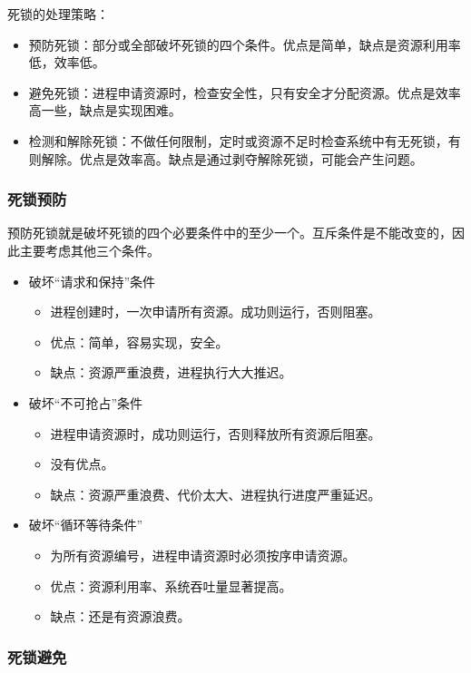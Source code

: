 \documentclass[12pt, a4paper, oneside]{ctexart}
\begin{document}
死锁的处理策略：
\begin{itemize}
  \item 预防死锁：部分或全部破坏死锁的四个条件。优点是简单，缺点是资源利用率低，效率低。
  \item 避免死锁：进程申请资源时，检查安全性，只有安全才分配资源。优点是效率高一些，缺点是实现困难。
  \item 检测和解除死锁：不做任何限制，定时或资源不足时检查系统中有无死锁，有则解除。优点是效率高。缺点是通过剥夺解除死锁，可能会产生问题。
\end{itemize}

\subsubsection{死锁预防}

预防死锁就是破坏死锁的四个必要条件中的至少一个。互斥条件是不能改变的，因此主要考虑其他三个条件。
\begin{itemize}
  \item 破坏“请求和保持”条件
  \begin{itemize}
    \item 进程创建时，一次申请所有资源。成功则运行，否则阻塞。
    \item 优点：简单，容易实现，安全。
    \item 缺点：资源严重浪费，进程执行大大推迟。
  \end{itemize}
  \item 破坏“不可抢占”条件
  \begin{itemize}
    \item 进程申请资源时，成功则运行，否则释放所有资源后阻塞。
    \item 没有优点。
    \item 缺点：资源严重浪费、代价太大、进程执行进度严重延迟。
  \end{itemize}
  \item 破坏“循环等待条件”
  \begin{itemize}
    \item 为所有资源编号，进程申请资源时必须按序申请资源。
    \item 优点：资源利用率、系统吞吐量显著提高。
    \item 缺点：还是有资源浪费。
  \end{itemize}
\end{itemize}

\subsubsection{死锁避免}
\end{document}

